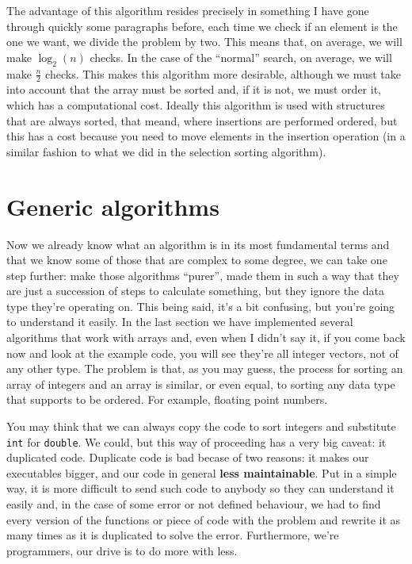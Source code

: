 \documentclass[a4paper]{article}
\begin{document}
The advantage of this algorithm resides precisely in something I have gone
through quickly some paragraphs before, each time we check if an element is the
one we want, we divide the problem by two. This means that, on average, we will
make $\log_{2}{\left(n\right)}$ checks. In the case of the ``normal'' search,
on average, we will make $\frac{n}{2}$ checks. This makes this algorithm more
desirable, although we must take into account that the array must be sorted and,
if it is not, we must order it, which has a computational cost. Ideally this
algorithm is used with structures that are always sorted, that meand, where
insertions are performed ordered, but this has a cost because you need to move
elements in the insertion operation (in a similar fashion to what we did in
the selection sorting algorithm).

\section{Generic algorithms}
Now we already know what an algorithm is in its most fundamental terms and that
we know some of those that are complex to some degree, we can take one step
further: make those algorithms ``purer'', made them in such a way that they are
just a succession of steps to calculate something, but they ignore the data type
they're operating on. This being said, it's a bit confusing, but you're going to
understand it easily. In the last section we have implemented several algorithms
that work with arrays and, even when I didn't say it, if you come back now and
look at the example code, you will see they're all integer vectors, not of any
other type. The problem is that, as you may guess, the process for sorting an
array of integers and an array is similar, or even equal, to sorting
any data type that supports to be ordered. For example, floating point numbers.

You may think that we can always copy the code to sort integers and substitute
\verb!int! for \verb!double!. We could, but this way of proceeding has a very
big caveat: it duplicated code. Duplicate code is bad becase of two reasons:
it makes our executables bigger, and our code in general \textbf{less
maintainable}. Put in a simple way, it is more difficult to send such code to
anybody so they can understand it easily and, in the case of some error or not
defined behaviour, we had to find every version of the functions or piece of
code with the problem and rewrite it as many times as it is duplicated to solve
the error. Furthermore, we're programmers, our drive is to do more with less.
\end{document}
